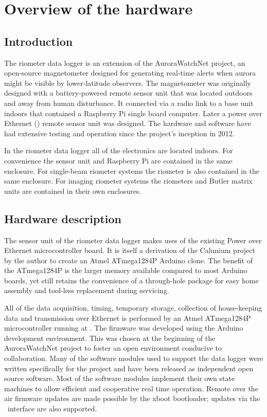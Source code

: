 \chapter{Overview of the hardware}

\section{Introduction}

The riometer data logger is an extension of the AuroraWatchNet
project, an open-source magnetometer designed for generating real-time
alerts when aurora might be visible by lower-latitude observers. The
magnetometer was originally designed with a battery-powered remote
sensor unit that was located outdoors and away from human
disturbance. It connected via a radio link to a base unit indoors that
contained a Raspberry Pi single board computer. Later a power over
Ethernet (\PoE) remote sensor unit was designed. The hardware and
software have had extensive testing and operation since the project's
inception in 2012.

In the riometer data logger all of the electronics are located
indoors. For convenience the sensor unit and Raspberry Pi are
contained in the same enclosure. For single-beam riometer systems the
riometer is also contained in the same enclosure. For imaging riometer
systems the riometers and Butler matrix units are contained in their
own enclosures.

\section{Hardware description}

The sensor unit of the riometer data logger makes uses of the existing
Power over Ethernet microcontroller board. It is itself a derivation
of the Calunium project by the author to create an Atmel ATmega1284P
Arduino clone. The benefit of the ATmega1284P is the larger memory
available compared to most Arduino boards, yet still retains the
convenience of a through-hole package for easy home assembly and
tool-less replacement during servicing.

All of the data acquisition, timing, temporary storage, collection of
house-keeping data and transmission over Ethernet is performed by an
Atmel ATmega1284P microcontroller running at . The firmware
was developed using the Arduino development environment. This was
chosen at the beginning of the AuroraWatchNet project to foster an
open environment conducive to collaboration. Many of the software
modules used to support the data logger were written specifically for
the project and have been released as independent open source
software. Most of the software modules implement their own state
machines to allow efficient and cooperative real time
operation. Remote over the air firmware updates are made possible by
the xboot bootloader; updates via the \usb\ interface are also
supported.

